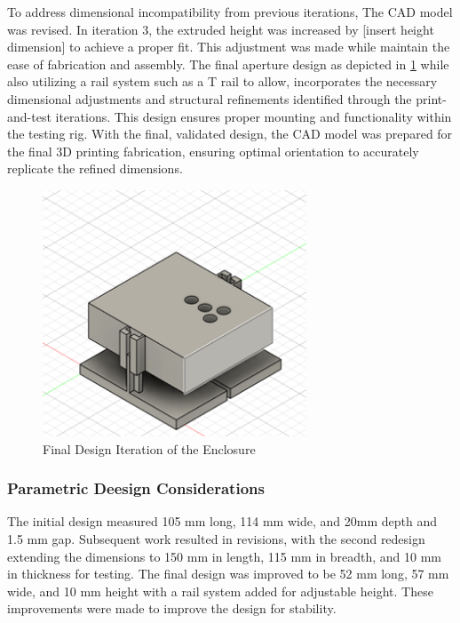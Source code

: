 To address dimensional incompatibility from previous iterations, The CAD model was revised. 
In iteration 3, the extruded height was increased by [insert height dimension] to achieve a proper fit. 
This adjustment was made while maintain the ease of fabrication and assembly.
The final aperture design as depicted in \ref{fig:CADFinal} while also utilizing a rail system such as a T rail to allow, incorporates the necessary dimensional adjustments and structural refinements identified through the print-and-test iterations. 
This design ensures proper mounting and functionality within the testing rig. 
With the final, validated design, the CAD model was prepared for the final 3D printing fabrication, ensuring optimal orientation to accurately replicate the refined dimensions.

\begin{figure}[htbp]
    \centering
    \includegraphics[width=0.7\textwidth]{figures/CAD-3DPrint/FinalCAD.png}
    \caption{Final Design Iteration of the Enclosure}
    \label{fig:CADFinal}
\end{figure}

\subsubsection{Parametric Deesign Considerations}
The initial design measured 105 mm long, 114 mm wide, and 20mm depth and 1.5 mm gap. 
Subsequent work resulted in revisions, with the second redesign extending the dimensions to 150 mm in length, 115 mm in breadth, and 10 mm in thickness for testing. 
The final design was improved to be 52 mm long, 57 mm wide, and 10 mm height with a rail system added for adjustable height. 
These improvements were made to improve the design for stability.

